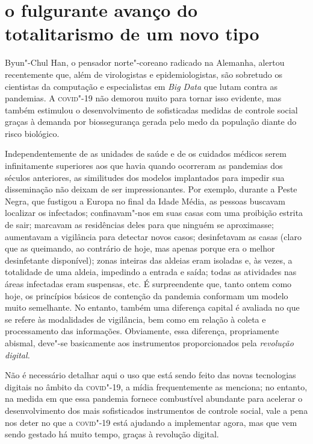 \section{o fulgurante avanço do totalitarismo de um novo tipo}

Byun"-Chul Han, o pensador norte"-coreano radicado na Alemanha, alertou
recentemente que, além de virologistas e epidemiologistas, são sobretudo
os cientistas da computação e especialistas em \emph{Big Data} que lutam
contra as pandemias. A \textsc{covid}"-19 não demorou muito para tornar isso
evidente, mas também estimulou o desenvolvimento de sofisticadas medidas
de controle social graças à demanda por biossegurança gerada pelo medo
da população diante do risco biológico.

Independentemente de as unidades de saúde e de os cuidados médicos serem
infinitamente superiores aos que havia quando ocorreram as pandemias dos
séculos anteriores, as similitudes dos modelos implantados para impedir
sua disseminação não deixam de ser impressionantes. Por exemplo, durante
a Peste Negra, que fustigou a Europa no final da Idade Média, as pessoas
buscavam localizar os infectados; confinavam"-nos em suas casas com uma
proibição estrita de sair; marcavam as residências deles para que
ninguém se aproximasse; aumentavam a vigilância para detectar novos
casos; desinfetavam as casas (claro que as queimando, ao contrário de
hoje, mas apenas porque era o melhor desinfetante disponível); zonas
inteiras das aldeias eram isoladas e, às vezes, a totalidade de uma
aldeia, impedindo a entrada e saída; todas as atividades nas áreas
infectadas eram suspensas, etc. É surpreendente que, tanto ontem como
hoje, os princípios básicos de contenção da pandemia conformam um modelo
muito semelhante. No entanto, também uma diferença capital é avaliada no
que se refere às modalidades de vigilância, bem como em relação à coleta
e processamento das informações. Obviamente, essa diferença,
propriamente abismal, deve"-se basicamente aos instrumentos
proporcionados pela \textit{revolução digital.}

Não é necessário detalhar aqui o uso que está sendo feito das novas
tecnologias digitais no âmbito da \textsc{covid}"-19, a mídia frequentemente as
menciona; no entanto, na medida em que essa pandemia fornece combustível
abundante para acelerar o desenvolvimento dos mais sofisticados
instrumentos de controle social, vale a pena nos deter no que a \textsc{covid}"-19
está ajudando a implementar agora, mas que vem sendo gestado há muito
tempo, graças à revolução digital.

